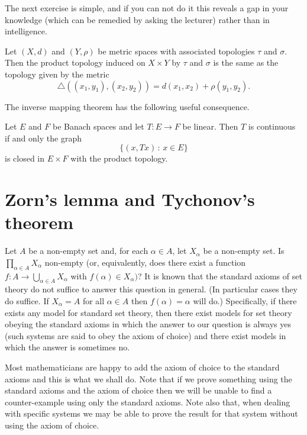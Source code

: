 The next exercise is simple, and if you can not
do it this reveals a gap in your knowledge
(which can be remedied by asking the lecturer)
rather than in intelligence.
\begin{exercise} Let $(X,d)$ and $(Y,\rho)$
be metric spaces with associated topologies
$\tau$ and $\sigma$. Then the product topology
induced on $X\times Y$ by $\tau$ and $\sigma$
is the same as the topology given by the metric
\[\triangle((x_{1},y_{1}),(x_{2},y_{2}))
=d(x_{1},x_{2})+\rho(y_{1},y_{2}).\]
\end{exercise} 
The inverse mapping theorem has the
following useful consequence.
\begin{theorem}
Let $E$ and $F$ be Banach spaces and let
$T:E\rightarrow F$ be linear.
Then $T$ is continuous if and only
the graph
\[\{(x,Tx)\,:\,x\in E\}\]
is closed in $E\times F$ with the product topology.
\end{theorem}
\section{Zorn's lemma and Tychonov's theorem}
Let $A$ be a non-empty set and, for each $\alpha\in A$,
let $X_{\alpha}$
be a non-empty set. Is $\prod_{\alpha\in A}X_{\alpha}$
non-empty (or, equivalently, does there exist a function
$f:A\rightarrow\bigcup_{\alpha\in A}X_{\alpha}$ with
$f(\alpha)\in X_{\alpha})$? It is known that the standard
axioms of set theory do not suffice to answer this question
in general. (In particular cases they do suffice. If
$X_{\alpha}=A$ for all $\alpha\in A$ then $f(\alpha)=\alpha$
will do.) Specifically, if there exists any
model for standard
set theory, then there exist models for set theory
obeying the standard axioms in which the answer to
our question is always yes (such systems are said to
obey the axiom of choice) and there exist models in
which the answer is sometimes no.

Most mathematicians are happy to add the axiom of choice
to the standard axioms and this is what we shall do.
Note that if we prove something using 
the standard axioms and the axiom of choice
then we will be unable to find a counter-example
using only the standard axioms. Note also that,
when dealing with specific systems we may be able
to prove the result for that system without using
the axiom of choice.

